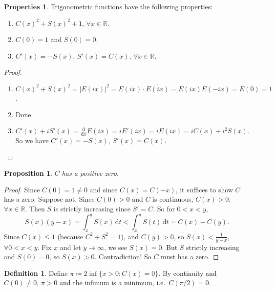 \documentclass[12pt]{article}
\theoremstyle{plain}
\newtheorem*{prop}{Proposition}
\theoremstyle{definition}
\newtheorem*{defn}{Definition}
\newtheorem*{property}{Properties}
\begin{document}
\begin{property}
    Trigonometric functions have the following properties:
    \begin{enumerate}
        \item $C(x)^2 + S(x)^2+1$, $\forall x\in\mathbb{R}$.
        \item $C(0) = 1$ and $S(0) = 0$.
        \item $C'(x) = -S(x)$, $S'(x) = C(x)$, $\forall x\in \mathbb{R}$.
    \end{enumerate}
\end{property}
\begin{proof}
    \begin{enumerate}
        \item $C(x)^2+S(x)^2 = \left|E(ix)\right|^2 = E(ix)\cdot\overline{E(ix)} = E(ix)E(-ix) = E(0) = 1$.
        \item Done.
        \item $C'(x) + iS'(x) = \frac{\mathrm{d}}{\mathrm{d}x}E(ix) = iE'(ix)=iE(ix) = iC(x) + i^2S(x)$.
            So we have $C'(x) = -S(x)$, $S'(x) = C(x)$.
    \end{enumerate}
\end{proof}

\begin{prop}
    $C$ has a positive zero.
\end{prop}
\begin{proof}
    Since $C(0) = 1\neq 0$ and since $C(x) = C(-x)$, it suffices to show $C$ has a zero.
    Suppose not.
    Since $C(0) > 0$ and $C$ is continuous, $C(x) > 0$, $\forall x\in\mathbb{R}$. Then $S$ is strictly increasing since
    $S'=C$.
    So for $0<x<y$, 
    \[S(x)(y-x) = \int_x^y S(x)\,\mathrm{d}t<\int_x^y S(t)\,\mathrm{d}t = C(x)-C(y).\]
    Since $C(x)\leq 1$ (because $C^2+S^2=1$), and $C(y)> 0$, so 
    $S(x)<\frac{1}{y-x}$, $\forall 0<x<y$.
    Fix $x$ and let $y\rightarrow \infty$, we see $S(x) = 0$.
    But $S$ strictly increasing and $S(0) = 0$, so $S(x) > 0$.
    Contradiction!
    So $C$ must has a zero.
\end{proof}

\begin{defn}
    Define $\pi\coloneqq 2 \inf\{x>0:C(x) = 0\}$.
    By continuity and $C(0)\neq 0$, $\pi > 0$ and the infimum is a minimum, i.e.\ $C(\pi/2) = 0$.
\end{defn}
\end{document}

